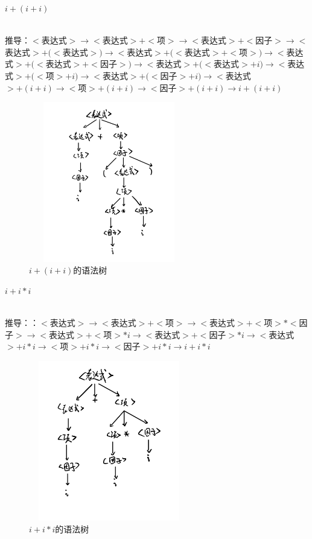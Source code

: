 \documentclass{cisXXX} %
\begin{document}
\begin{CJK}{UTF8}{gbsn}
$i+(i+i)$

~\\推导：$<$表达式$>\rightarrow  <$表达式$>+<$项$>\rightarrow  <$表达式$>+ <$因子$>\rightarrow  <$表达式$>+(<$表达式$>)\rightarrow<$表达式$>+(<$表达式$>+<$项$>)\rightarrow<$表达式$>+(<$表达式$>+<$因子$>)\rightarrow<$表达式$>+(<$表达式$>+i)\rightarrow<$表达式$>+(<$项$>+i)\rightarrow<$表达式$>+(<$因子$>+i)\rightarrow<$表达式$>+(i+i)\rightarrow<$项$>+(i+i)\rightarrow<$因子$>+(i+i)\rightarrow i+(i+i)$
\begin{figure}[ht]
	\centering
	\includegraphics[width=7cm,height=7cm]{1_5.png}
	\caption{$i+(i+i)$的语法树}
	\label{fig:label}
\end{figure}    
\HWsubproblem 
$i+i*i$

~\\推导：：$<$表达式$>\rightarrow <$表达式$>+<$项$>\rightarrow <$表达式$>+<$项$>*<$因子$>\rightarrow <$表达式$>+<$项$>*i\rightarrow <$表达式$>+<$因子$>*i\rightarrow <$表达式$>+i*i\rightarrow <$项$>+i*i\rightarrow <$因子$>+i*i\rightarrow i+i*i$
\begin{figure}[ht]
	\centering
	\includegraphics[width=7cm,height=7cm]{1_6.png}
	\caption{$i+i*i$的语法树}
	\label{fig:label}
\end{figure}  
~\\
~\\
~\\
  

\end{CJK}
\end{document}
